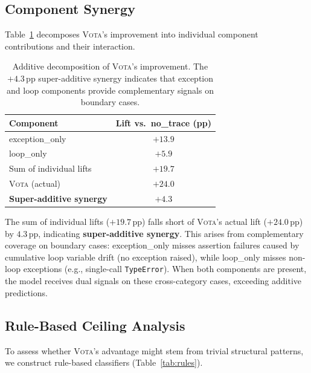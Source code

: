 \documentclass[11pt,a4paper]{article}
\newcommand{\vota}{\textsc{Vota}}
\newcommand{\pp}{\,\text{pp}}
\begin{document}
\subsection{Component Synergy}
\label{sec:synergy}

Table~\ref{tab:synergy} decomposes \vota{}'s improvement into individual component contributions and their interaction.

\begin{table}[t]
\centering
\small
\begin{tabular}{lc}
\toprule
\textbf{Component} & \textbf{Lift vs.\ no\_trace (pp)} \\
\midrule
exception\_only & $+13.9$ \\
loop\_only & $+5.9$ \\
\midrule
Sum of individual lifts & $+19.7$ \\
\vota{} (actual) & $+24.0$ \\
\midrule
\textbf{Super-additive synergy} & $\mathbf{+4.3}$ \\
\bottomrule
\end{tabular}
\caption{Additive decomposition of \vota{}'s improvement. The $+4.3\pp$ super-additive synergy indicates that exception and loop components provide complementary signals on boundary cases.}
\label{tab:synergy}
\end{table}

The sum of individual lifts ($+19.7\pp$) falls short of \vota{}'s actual lift ($+24.0\pp$) by $4.3\pp$, indicating \textbf{super-additive synergy}.
This arises from complementary coverage on boundary cases: exception\_only misses assertion failures caused by cumulative loop variable drift (no exception raised), while loop\_only misses non-loop exceptions (e.g., single-call \texttt{TypeError}).
When both components are present, the model receives dual signals on these cross-category cases, exceeding additive predictions.

\subsection{Rule-Based Ceiling Analysis}
\label{sec:rules}

To assess whether \vota{}'s advantage might stem from trivial structural patterns, we construct rule-based classifiers (Table~\ref{tab:rules}).
\end{document}
